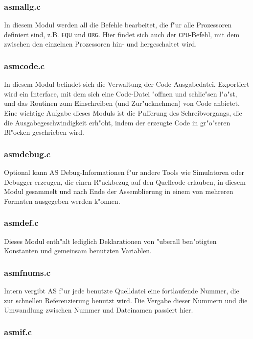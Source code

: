 \documentclass[12pt,a4paper,twoside]{report}
\newcommand{\tty}[1]{{\tt #1}}
\begin{document}
\subsubsection{asmallg.c}

In diesem Modul werden all die Befehle bearbeitet, die f"ur alle Prozessoren
definiert sind, z.B. \tty{EQU} und \tty{ORG}.  Hier findet sich auch der
\tty{CPU}-Befehl, mit dem zwischen den einzelnen Prozessoren hin- und
hergeschaltet wird.

\subsubsection{asmcode.c}

In diesem Modul befindet sich die Verwaltung der Code-Ausgabedatei.
Exportiert wird ein Interface, mit dem sich eine Code-Datei "offnen
und schlie"sen l"a"st, und das Routinen zum Einschreiben (und
Zur"ucknehmen) von Code anbietet.  Eine wichtige Aufgabe dieses Moduls
ist die Pufferung des Schreibvorgangs, die die Ausgabegeschwindigkeit
erh"oht, indem der erzeugte Code in gr"o"seren Bl"ocken geschrieben wird.

\subsubsection{asmdebug.c}

Optional kann AS Debug-Informationen f"ur andere Tools wie Simulatoren
oder Debugger erzeugen, die einen R"uckbezug auf den Quellcode erlauben,
in diesem Modul gesammelt und nach Ende der Assemblierung in einem von
mehreren Formaten ausgegeben werden k"onnen.

\subsubsection{asmdef.c}

Dieses Modul enth"alt lediglich Deklarationen von "uberall ben"otigten
Konstanten und gemeinsam benutzten Variablen.

\subsubsection{asmfnums.c}

Intern vergibt AS f"ur jede benutzte Quelldatei eine fortlaufende Nummer,
die zur schnellen Referenzierung benutzt wird.  Die Vergabe dieser Nummern
und die Umwandlung zwischen Nummer und Dateinamen passiert hier.

\subsubsection{asmif.c}
\end{document}
